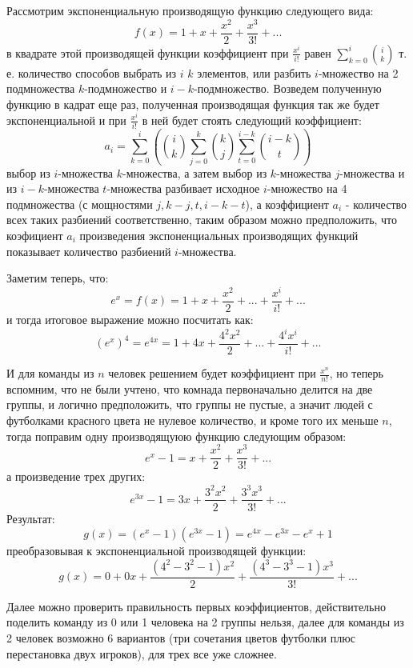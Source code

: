 \documentclass[a4paper,12pt]{article}
\begin{document}
\begin{Solution}
Рассмотрим экспоненциальную производящую функцию следующего вида:
\[
	f\left(x\right) = 1 + x + \frac{x^2}{2} + \frac{x^3}{3!} + ...
\]
в квадрате этой производящей функции коэффициент при $\frac{x^i}{i!}$ равен $\sum_{k=0}^i \binom{i}{k}$ т. е. количество способов выбрать из $i$ $k$ элементов, или разбить $i$-множество на 2 подмножества $k$-подмножество и $i-k$-подмножество. Возведем полученную функцию в кадрат еще раз, полученная производящая функция так же будет экспоненциальной и при $\frac{x^i}{i!}$ в ней будет стоять следующий коэффициент:
\[
	a_i = \sum_{k=0}^i \left(\binom{i}{k} \sum_{j=0}^k \binom{k}{j} \sum_{t=0}^{i-k} \binom{i-k}{t}\right)
\]
выбор из $i$-множества $k$-множества, а затем выбор из $k$-множества $j$-множества и из $i-k$-множества $t$-множества разбивает исходное $i$-множество на 4 подмножества (с мощностями $j, k-j, t, i-k-t$), а коэффициент $a_i$ - количество всех таких разбиений соответственно, таким образом можно предположить, что коэфициент $a_i$ произведения экспоненциальных производящих функций показывает количество разбиений $i$-множества.

Заметим теперь, что:
\[
	e^x = f\left(x\right) = 1 + x + \frac{x^2}{2} + ... + \frac{x^i}{i!} + ...
\]
и тогда итоговое выражение можно посчитать как:
\[
	{\left(e^x\right)}^4 = e^{4x} = 1 + 4x + \frac{4^2 x^2}{2} + ... + \frac{4^i x^i}{i!} + ...
\]

И для команды из $n$ человек решением будет коэффициент при $\frac{x^n}{n!}$, но теперь вспомним, что не были учтено, что комнада первоначально делится на две группы, и логично предположить, что группы не пустые, а значит людей с футболками красного цвета не нулевое количество, и кроме того их меньше $n$, тогда поправим одну производящуюю функцию следующим образом:
\[
	e^x - 1 = x + \frac{x^2}{2} + \frac{x^3}{3!} + ...
\]
а произведение трех других:
\[
	e^{3x} - 1 = 3 x + \frac{3^2 x^2}{2} + \frac{3^3 x^3}{3!} + ...
\]
Результат:
\[
	g\left(x\right) = \left(e^x - 1\right) \left(e^{3x} - 1\right) = e^{4x} - e^{3x} - e^x + 1
\]
преобразовывая к экспоненциальной производящей функции:
\[
	g\left(x\right) = 0 + 0 x + \frac{\left(4^2 - 3^2 - 1\right) x^2}{2} + \frac{\left(4^3 - 3^3 - 1\right) x^3}{3!} + ...
\]

Далее можно проверить правильность первых коэффициентов, действительно поделить команду из 0 или 1 человека на 2 группы нельзя, далее для команды из 2 человек возможно 6 вариантов (три сочетания цветов футболки плюс перестановка двух игроков), для трех все уже сложнее.
\end{Solution}
\end{document}
